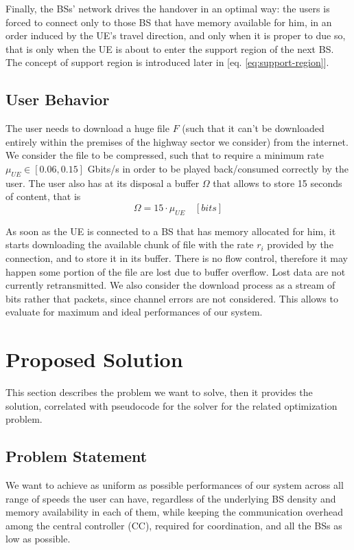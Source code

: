 \documentclass[conference,10pt]{IEEEtran}
\begin{document}
Finally, the BSs' network drives the handover in an optimal way: the users is forced to connect only to those BS that have memory available for him, in an order induced by the UE's travel direction, and only when it is proper to due so, that is only when the UE is about to enter the support region of the next BS. The concept of support region is introduced later in [eq. \ref{eq:support-region}].

\subsection{User Behavior}

The user needs to download a huge file $F$ (such that it can't be downloaded entirely within the premises of the highway sector we consider) from the internet. We consider the file to be compressed, such that to require a minimum rate $\mu_{U\!E} \in [0.06, 0.15]$ Gbits/s in order to be played back/consumed correctly by the user. The user also has at its disposal a buffer $\Omega$ that allows to store 15 seconds of content, that is
\begin{equation}
\Omega = 15 \cdot \mu_{U\!E} \quad [bits]
\end{equation}

 As soon as the UE is connected to a BS that has memory allocated for him, it starts downloading the available chunk of file with the rate $r_i$ provided by the connection, and to store it in its buffer. There is no flow control, therefore it may happen some portion of the file are lost due to buffer overflow. Lost data are not currently retransmitted. We also consider the download process as a stream of bits rather that packets, since channel errors are not considered. This allows to evaluate for maximum and ideal performances of our system.
 
\section{Proposed Solution}
 
This section describes the problem we want to solve, then it provides the solution, correlated with pseudocode for the solver for the related optimization problem.

\subsection{Problem Statement}

We want to achieve as uniform as possible performances of our system across all range of speeds the user can have, regardless of the underlying BS density and memory availability in each of them, while keeping the communication overhead among the central controller (CC), required for coordination, and all the BSs as low as possible. 
\end{document}
